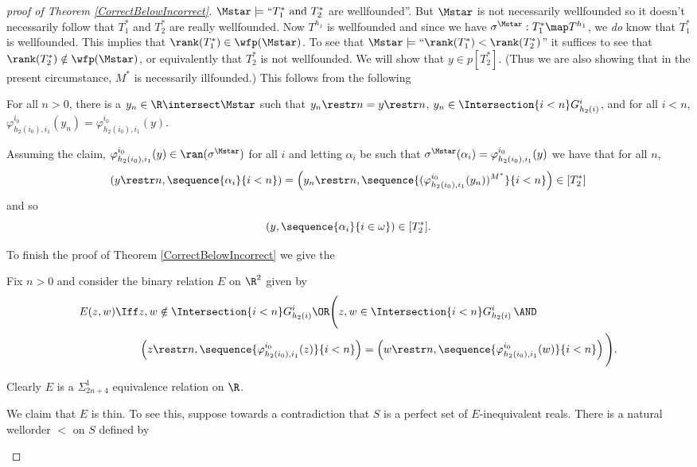 \documentclass[oneside,12pt]{amsart}
\begin{document}
\begin{proof}[proof of Theorem \ref{CorrectBelowIncorrect}]
$\Mstar\models \text{``}T_1^* \text{ and } T_2^*$ are wellfounded''. But $\Mstar$ is not
necessarily wellfounded so it doesn't necessarily follow that $T_1^*$ and $T_2^*$ are really wellfounded.
Now $T^{h_1}$ is wellfounded and since we have $\sigma^{\Mstar}:T_1^*\map T^{h_1}$,
we \emph{do} know that $T_1^*$ is wellfounded. This implies that
$\rank(T_1^*)\in\wfp(\Mstar)$.
To see that $\Mstar\models\text{``}\rank(T_1^*) < \rank(T_2^*)$'' it suffices to
see that $\rank(T_2^*)\notin\wfp(\Mstar)$, or equivalently that $T_2^*$ is not wellfounded.
We will show that $y\in p[T_2^*]$. (Thus we are also showing that in the present
circumstance, $M^*$ is necessarily illfounded.)
This follows from the following

\begin{claim}
For all $n>0$, there is a $y_n\in \R\intersect\Mstar$ such that $y_n\restr n = y \restr n$,
$y_n \in  \Intersection{i<n} G^i_{h_2(i)}$,
and for all $i < n$, $\varphi^{i_0}_{h_2(i_0),i_1}(y_n) = \varphi^{i_0}_{h_2(i_0),i_1}(y)$.
\end{claim}

Assuming the claim, $\varphi^{i_0}_{h_2(i_0),i_1}(y)\in\ran(\sigma^{\Mstar})$ for all $i$
and letting $\alpha_i$ be such that $\sigma^{\Mstar}(\alpha_i)=\varphi^{i_0}_{h_2(i_0),i_1}(y)$
we have that for all $n$,
$$\left(y\restr n, \sequence{\alpha_i}{i<n} \right)=
\left(y_n\restr n, \sequence{(\varphi^{i_0}_{h_2(i_0),i_1}(y_n))^{M^*}}{i<n} \right)\in[T^*_2]$$
and so
$$\left(y, \sequence{\alpha_i}{i\in\omega} \right)\in[T^*_2].$$

To finish the proof of Theorem \ref{CorrectBelowIncorrect} we give the

\begin{subproof}
Fix $n>0$ and consider the binary relation $E$ on $\R^2$ given by
\begin{align*}
E(z,w) \Iff &z,w\notin \Intersection{i<n} G^i_{h_2(i)} \OR \Bigg( z,w \in \Intersection{i<n} G^i_{h_2(i)} \, \AND  \\
&\left( z\restr n, \sequence{\varphi^{i_0}_{h_2(i_0),i_1}(z)}{i<n}\right) = \left( w\restr n, \sequence{\varphi^{i_0}_{h_2(i_0),i_1}(w)}{i<n}\right) \Bigg).
\end{align*}

Clearly $E$ is a $\Sigma^1_{2n+4}$ equivalence relation on $\R$.

We claim that $E$ is thin. To see this, suppose towards a contradiction that $S$ is a perfect set of $E$-inequivalent reals.
There is a natural wellorder $<$ on $S$ defined by


\end{subproof}
\end{proof}
\end{document}
